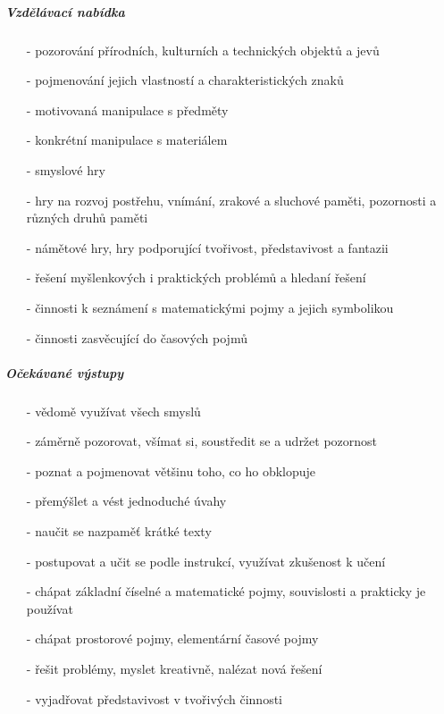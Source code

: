 					\subparagraph{Vzdělávací nabídka}

					\begin{itemize}
					\setlength\itemsep{-2mm}
						\item[-]pozorování přírodních, kulturních a technických objektů a jevů
						\item[-]pojmenování jejich vlastností a charakteristických znaků
						\item[-]motivovaná manipulace s předměty
						\item[-]konkrétní manipulace s materiálem
						\item[-]smyslové hry
						\item[-]hry na rozvoj postřehu, vnímání, zrakové a sluchové paměti, pozornosti a různých druhů paměti
						\item[-]námětové hry, hry podporující tvořivost, představivost a fantazii
						\item[-]řešení myšlenkových i praktických problémů a hledaní řešení
						\item[-]činnosti k seznámení s matematickými pojmy a jejich symbolikou
						\item[-]činnosti zasvěcující do časových pojmů
					\end{itemize}

					\subparagraph{Očekávané výstupy}

					\begin{itemize}
					\setlength\itemsep{-2mm}
						\item[-]vědomě využívat všech smyslů
						\item[-]záměrně pozorovat, všímat si, soustředit se a udržet pozornost
						\item[-]poznat a pojmenovat většinu toho, co ho obklopuje
						\item[-]přemýšlet a vést jednoduché úvahy
						\item[-]naučit se nazpaměť krátké texty
						\item[-]postupovat a učit se podle instrukcí, využívat zkušenost k učení
						\item[-]chápat základní číselné a matematické pojmy, souvislosti a prakticky je používat
						\item[-]chápat prostorové pojmy, elementární časové pojmy
						\item[-]řešit problémy, myslet kreativně, nalézat nová řešení
						\item[-]vyjadřovat představivost v tvořivých činnosti
					\end{itemize}
									
